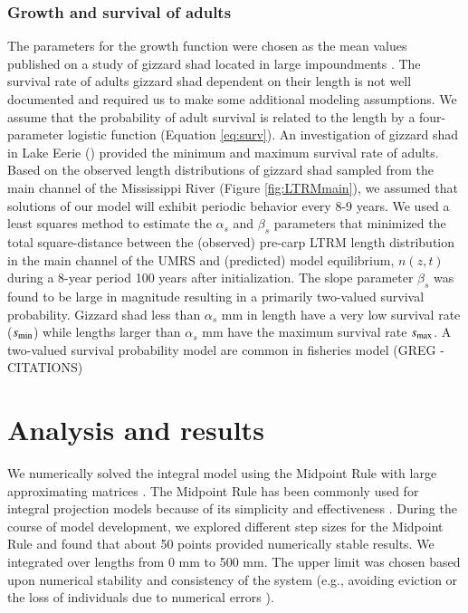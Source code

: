\documentclass[preprint,review,12pt,authoryear]{elsarticle}
\def\ds{\displaystyle}
\begin{document}
\subsubsection{Growth and survival of adults}
The parameters for the growth function were chosen as the mean values published on a study of gizzard shad located in large impoundments \citep{michaletz2017variation}. 
The survival rate of adults gizzard shad dependent on their length is not well documented and required us to make some additional modeling assumptions.  
We assume that the probability of adult survival is related to the length by a four-parameter logistic function (Equation \ref{eq:surv}).
An investigation of gizzard shad in Lake Eerie (\cite{bodola1955life}) provided the minimum and maximum survival rate of adults. 
Based on the observed length distributions of gizzard shad sampled from the main channel of the Mississippi River (Figure \ref{fig:LTRMmain}), we assumed that solutions of our model will exhibit periodic behavior every 8-9 years.   
We used a least squares method to estimate the $\alpha_s$ and $\beta_s$ parameters that 
minimized the total square-distance between the (observed) pre-carp LTRM length distribution in the main channel of the UMRS and (predicted) model equilibrium, $n(z,t)$ during a 8-year period 100 years after initialization.  
The slope parameter $\beta_s$ was found to be large in magnitude resulting in a primarily two-valued survival probability.  
Gizzard shad less than $\alpha_s$ mm in length have a very low survival rate ($\ds s_{\rm {min}}$) while lengths larger than  $\alpha_s$ mm have the maximum survival rate $\ds s_{\rm {max}}$. 
A two-valued survival probability model are common in fisheries model (GREG - CITATIONS)

\section{Analysis and results}
We numerically solved the integral model using the Midpoint Rule with large approximating matrices \citep{burden2005numerical}. 
The Midpoint Rule has been commonly used for integral projection models because of its simplicity and effectiveness \citep{ellner2006integral, ramula2009integral,  merow2014advancing}. 
During the course of model development, we explored different step sizes for the Midpoint Rule and found that about 50 points provided numerically stable results. 
We integrated over lengths from 0 mm to 500 mm. 
The upper limit was chosen based upon numerical stability and consistency of the system (e.g., avoiding eviction or the loss of individuals due to numerical errors \citep{williams2012avoiding}). 
\end{document}
